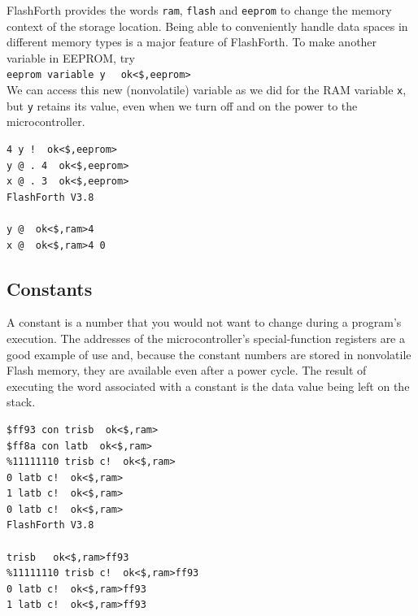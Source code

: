 \documentclass[12pt,a4paper]{article}
\begin{document}
\medskip
FlashForth provides the words \verb!ram!, \verb!flash! and \verb!eeprom!
to change the memory context of the storage location.
Being able to conveniently handle data spaces in different
memory types is a major feature of FlashForth.
To make another variable in EEPROM, try \vspace{7pt} \\
\verb?eeprom variable y ? \fbox{$\hookleftarrow$} \verb! ok<$,eeprom>! \vspace{7pt} \\
We can access this new (nonvolatile) variable as we did for the RAM variable \verb!x!,
but \verb!y! retains its value, even when we turn off and on the power to the microcontroller.
\begin{verbatim}
4 y !  ok<$,eeprom>
y @ . 4  ok<$,eeprom>
x @ . 3  ok<$,eeprom>
FlashForth V3.8

y @  ok<$,ram>4 
x @  ok<$,ram>4 0 
\end{verbatim}

% 


\medskip
\subsection{Constants}
\label{sec:constants}
%
A constant is a number that you would not want to change during a program's execution.
The addresses of the microcontroller's special-function registers are a good example 
of use and, because the constant numbers are stored in nonvolatile Flash memory, they are
available even after a power cycle.
The result of executing the word associated with a constant is the data value being left on the stack.
\begin{verbatim}
$ff93 con trisb  ok<$,ram> 
$ff8a con latb  ok<$,ram>
%11111110 trisb c!  ok<$,ram>
0 latb c!  ok<$,ram>
1 latb c!  ok<$,ram>
0 latb c!  ok<$,ram>
FlashForth V3.8

trisb   ok<$,ram>ff93 
%11111110 trisb c!  ok<$,ram>ff93 
0 latb c!  ok<$,ram>ff93 
1 latb c!  ok<$,ram>ff93 
\end{verbatim}
\end{document}

